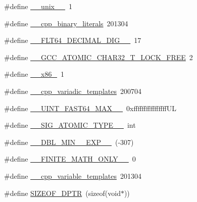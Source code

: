 \begin{DoxyCompactItemize}
\item 
\#define \hyperlink{cmake-build-debug_2babel__client__autogen_2moc__predefs_8h_aa5be39d362c571d48d6236f0bd58f1fc}{\+\_\+\+\_\+unix\+\_\+\+\_\+}~1
\item 
\#define \hyperlink{cmake-build-debug_2babel__client__autogen_2moc__predefs_8h_ade9dc15e022182eb0a62a0fd17d18b75}{\+\_\+\+\_\+cpp\+\_\+binary\+\_\+literals}~201304
\item 
\#define \hyperlink{cmake-build-debug_2babel__client__autogen_2moc__predefs_8h_a8ef55ba782e9d01cb22911f97168d06a}{\+\_\+\+\_\+\+F\+L\+T64\+\_\+\+D\+E\+C\+I\+M\+A\+L\+\_\+\+D\+I\+G\+\_\+\+\_\+}~17
\item 
\#define \hyperlink{cmake-build-debug_2babel__client__autogen_2moc__predefs_8h_a98e298953067135caf4bc0b8e8e7cd01}{\+\_\+\+\_\+\+G\+C\+C\+\_\+\+A\+T\+O\+M\+I\+C\+\_\+\+C\+H\+A\+R32\+\_\+\+T\+\_\+\+L\+O\+C\+K\+\_\+\+F\+R\+EE}~2
\item 
\#define \hyperlink{cmake-build-debug_2babel__client__autogen_2moc__predefs_8h_a64b6ba77bbc2cb5db2a19f32e954fcc3}{\+\_\+\+\_\+x86\+\_}~1
\item 
\#define \hyperlink{cmake-build-debug_2babel__client__autogen_2moc__predefs_8h_a559dd2b0792fc2b0b30ba1dd66ca7cdc}{\+\_\+\+\_\+cpp\+\_\+variadic\+\_\+templates}~200704
\item 
\#define \hyperlink{cmake-build-debug_2babel__client__autogen_2moc__predefs_8h_a17a1ff08595cf7e0c9d1f162b727ccb6}{\+\_\+\+\_\+\+U\+I\+N\+T\+\_\+\+F\+A\+S\+T64\+\_\+\+M\+A\+X\+\_\+\+\_\+}~0xffffffffffffffff\+UL
\item 
\#define \hyperlink{cmake-build-debug_2babel__client__autogen_2moc__predefs_8h_ac60fe3845f87fdaf6365a733ede87cfe}{\+\_\+\+\_\+\+S\+I\+G\+\_\+\+A\+T\+O\+M\+I\+C\+\_\+\+T\+Y\+P\+E\+\_\+\+\_\+}~int
\item 
\#define \hyperlink{cmake-build-debug_2babel__client__autogen_2moc__predefs_8h_a1abd7cf346a460459d7fe1a9d4b5dde9}{\+\_\+\+\_\+\+D\+B\+L\+\_\+\+M\+I\+N\+\_\+\_\+\+E\+X\+P\+\_\+\+\_\+}~(-\/307)
\item 
\#define \hyperlink{cmake-build-debug_2babel__client__autogen_2moc__predefs_8h_a611d40c375b1972669292fd27bc4afb7}{\+\_\+\+\_\+\+F\+I\+N\+I\+T\+E\+\_\+\+M\+A\+T\+H\+\_\+\+O\+N\+L\+Y\+\_\+\+\_\+}~0
\item 
\#define \hyperlink{cmake-build-debug_2babel__client__autogen_2moc__predefs_8h_a5f5ce266e768d95b9fd04856e5826aff}{\+\_\+\+\_\+cpp\+\_\+variable\+\_\+templates}~201304
\item 
\#define \hyperlink{cmake-build-debug_2babel__client__autogen_2moc__predefs_8h_addad5b57ed33bc5c79361574d9e03c06}{S\+I\+Z\+E\+O\+F\+\_\+\+D\+P\+TR}~(sizeof(void$\ast$))

\end{DoxyCompactItemize}
